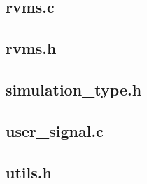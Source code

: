 \subsection{rvms.c}


\subsection{rvms.h}


\subsection{simulation\_type.h}


\subsection{user\_signal.c}


\subsection{utils.h}


